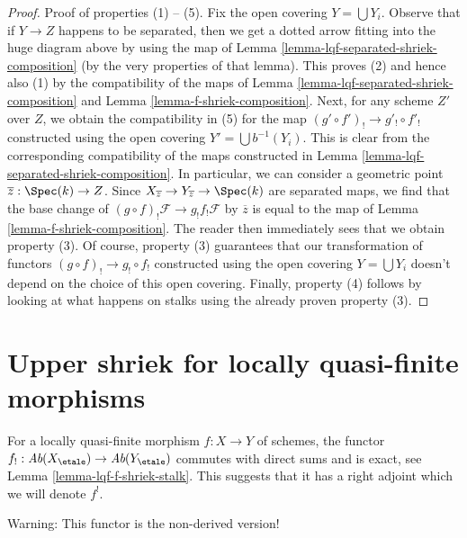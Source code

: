 \begin{proof}
\medskip\noindent
Proof of properties (1) -- (5). Fix the open covering $Y = \bigcup Y_i$.
Observe that if $Y \to Z$ happens to be separated, then we get a dotted
arrow fitting into the huge diagram above by using the map of
Lemma \ref{lemma-lqf-separated-shriek-composition}
(by the very properties of that lemma).
This proves (2) and hence also (1) by the compatibility of the
maps of Lemma \ref{lemma-lqf-separated-shriek-composition}
and Lemma \ref{lemma-f-shriek-composition}.
Next, for any scheme $Z'$ over $Z$, we obtain the compatibility in (5)
for the map $(g' \circ f')_! \to g'_! \circ f'_!$
constructed using the open covering $Y' = \bigcup b^{-1}(Y_i)$.
This is clear from the corresponding compatibility of the maps
constructed in Lemma \ref{lemma-lqf-separated-shriek-composition}.
In particular, we can consider a geometric point
$\overline{z} : \Spec(k) \to Z$. Since
$X_{\overline{z}} \to Y_{\overline{z}} \to \Spec(k)$
are separated maps, we find that the base change of
$(g \circ f)_!\mathcal{F} \to g_! f_! \mathcal{F}$
by $\overline{z}$ is equal to the map of
Lemma \ref{lemma-f-shriek-composition}.
The reader then immediately sees that we obtain property (3).
Of course, property (3) guarantees that our transformation of functors
$(g \circ f)_! \to g_! \circ f_!$ constructed using the open covering
$Y = \bigcup Y_i$ doesn't depend on the choice of this open covering.
Finally, property (4) follows by looking at what happens on stalks
using the already proven property (3).
\end{proof}











\section{Upper shriek for locally quasi-finite morphisms}
\label{section-duality-locally-quasi-finite}

\noindent
For a locally quasi-finite morphism $f : X \to Y$ of schemes, the
functor $f_! : \textit{Ab}(X_\etale) \to \textit{Ab}(Y_\etale)$ commutes
with direct sums and is exact, see Lemma \ref{lemma-lqf-f-shriek-stalk}.
This suggests that it has a right adjoint which we will denote $f^!$.

\medskip\noindent
Warning: This functor is the non-derived version!

